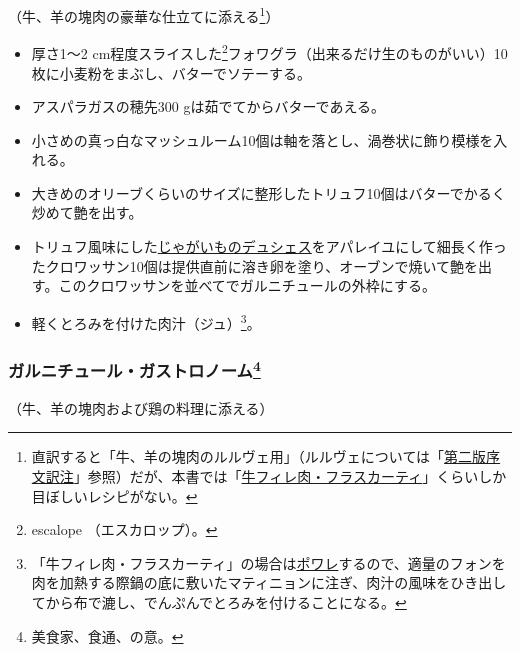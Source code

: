 \begin{recette}
（牛、羊の塊肉の豪華な仕立てに添える\footnote{直訳すると「牛、羊の塊肉のルルヴェ用」（ルルヴェについては「\protect\hyperlink{releve}{第二版序文訳注}」参照）だが、本書では「\protect\hyperlink{filet-de-boeur-frascati}{牛フィレ肉・フラスカーティ}」くらいしか目ぼしいレシピがない。}）

\begin{itemize}
\item
  厚さ1〜2 cm程度スライスした\footnote{escalope （エスカロップ）。}フォワグラ（出来るだけ生のものがいい）10枚に小麦粉をまぶし、バターでソテーする。
\item
  アスパラガスの穂先300 gは茹でてからバターであえる。
\item
  小さめの真っ白なマッシュルーム10個は軸を落とし、渦巻状に飾り模様を入れる。
\item
  大きめのオリーブくらいのサイズに整形したトリュフ10個はバターでかるく炒めて艶を出す。
\item
  トリュフ風味にした\protect\hyperlink{pommes-de-terre-duchesse}{じゃがいものデュシェス}をアパレイユにして細長く作ったクロワッサン10個は提供直前に溶き卵を塗り、オーブンで焼いて艶を出す。このクロワッサンを並べてでガルニチュールの外枠にする。
\item
  軽くとろみを付けた肉汁（ジュ）\footnote{「牛フィレ肉・フラスカーティ」の場合は\protect\hyperlink{les-poeles}{ポワレ}するので、適量のフォンを肉を加熱する際鍋の底に敷いたマティニョンに注ぎ、肉汁の風味をひき出してから布で漉し、でんぷんでとろみを付けることになる。}。
\end{itemize}

\hypertarget{garniture-a-la-gastronome}{%
\subsubsection[ガルニチュール・ガストロノーム]{\texorpdfstring{ガルニチュール・ガストロノーム\footnote{美食家、食通、の意。}}{ガルニチュール・ガストロノーム}}\label{garniture-a-la-gastronome}}



（牛、羊の塊肉および鶏の料理に添える）


\end{recette}
